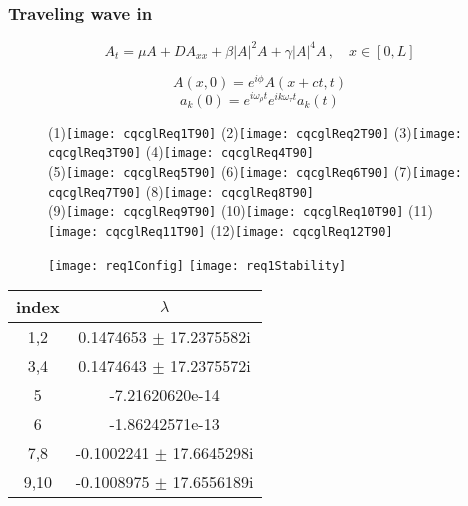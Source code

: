 \documentclass[mathserif, handout]{beamer}
\begin{document}
\begin{frame}[allowframebreaks]
  \frametitle{\small{Traveling wave in \cqcGLe}}
  \begin{equation}
    A_t = \mu A + DA_{xx} + \beta |A|^2A + \gamma |A|^4A \,,\quad x\in[0,L]
  \end{equation}

  \[
    A(x, 0) = e^{i\phi}A(x+ct, t)
  \]
  \begin{equation}
    a_k(0) = e^{i\omega_\rho t}e^{ik\omega_\tau t}a_k(t)
    \label{eq:travelWaveFourier}
  \end{equation}

  \begin{figure}[h]
    \centering
    (1)\texttt{[image: cqcglReq1T90]}
    (2)\texttt{[image: cqcglReq2T90]}
    (3)\texttt{[image: cqcglReq3T90]}
    (4)\texttt{[image: cqcglReq4T90]}\\
    (5)\texttt{[image: cqcglReq5T90]}
    (6)\texttt{[image: cqcglReq6T90]}
    (7)\texttt{[image: cqcglReq7T90]}
    (8)\texttt{[image: cqcglReq8T90]}\\
    (9)\texttt{[image: cqcglReq9T90]}
   (10)\texttt{[image: cqcglReq10T90]}
   (11)\texttt{[image: cqcglReq11T90]}
   (12)\texttt{[image: cqcglReq12T90]}
    \label{fig:cqcglReqSet}
  \end{figure}

  \begin{figure}[h]
    \centering
    \texttt{[image: req1Config]} \hfill
    \texttt{[image: req1Stability]}
    \label{fig:req1Config}
  \end{figure}

  \begin{table}
    \centering
    \begin{tabular}{c | c}
      index & $\lambda$ \\
      \hline
      1,2    &    0.1474653 $\pm$      17.2375582i\\
      3,4    &    0.1474643 $\pm$      17.2375572i\\
      5    &    -7.21620620e-14             \\
      6    &     -1.86242571e-13  \\
      7,8    &   -0.1002241 $\pm$      17.6645298i\\
      9,10    &   -0.1008975 $\pm$      17.6556189i\\
      \hline
    \end{tabular}
    \label{tab:req1Stability}
  \end{table}


\end{frame}
\end{document}
